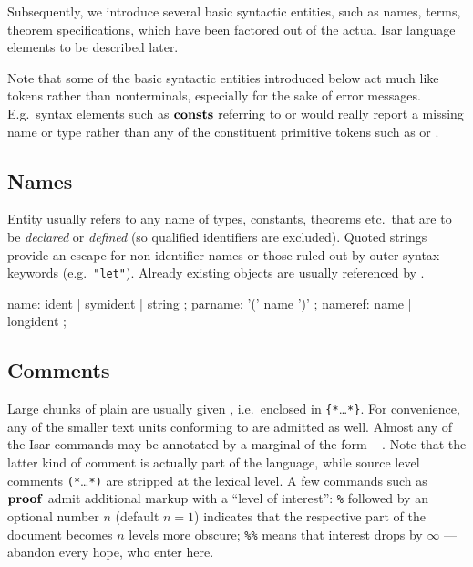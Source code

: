 Subsequently, we introduce several basic syntactic entities, such as names,
terms, theorem specifications, which have been factored out of the actual Isar
language elements to be described later.

Note that some of the basic syntactic entities introduced below act much like
tokens rather than nonterminals, especially for the sake of error messages.
E.g.\ syntax elements such as ${\mathord{\mathbf{consts}}}$ referring to  or
 would really report a missing name or type rather than any
of the constituent primitive tokens such as  or
.


\subsection{Names}

Entity  usually refers to any name of types, constants,
theorems etc.\ that are to be \emph{declared} or \emph{defined} (so qualified
identifiers are excluded).  Quoted strings provide an escape for
non-identifier names or those ruled out by outer syntax keywords (e.g.\ 
\verb|"let"|).  Already existing objects are usually referenced by
\railqtoken{nameref}.

\begin{rail}
  name: ident | symident | string
  ;
  parname: '(' name ')'
  ;
  nameref: name | longident
  ;
\end{rail}


\subsection{Comments}\label{sec:comments}

Large chunks of plain  are usually given
, i.e.\ enclosed in \verb|{*|\dots\verb|*}|.  For
convenience, any of the smaller text units conforming to 
are admitted as well.  Almost any of the Isar commands may be annotated by a
marginal \railnonterm{comment} of the form \texttt{--} \railqtoken{text}.
Note that the latter kind of comment is actually part of the language, while
source level comments \verb|(*|\dots\verb|*)| are stripped at the lexical
level.  A few commands such as ${\mathord{\mathbf{proof}}}$ admit additional markup with a
``level of interest'': \texttt{\%} followed by an optional number $n$ (default
$n = 1$) indicates that the respective part of the document becomes $n$ levels
more obscure; \texttt{\%\%} means that interest drops by $\infty$ --- abandon
every hope, who enter here.

